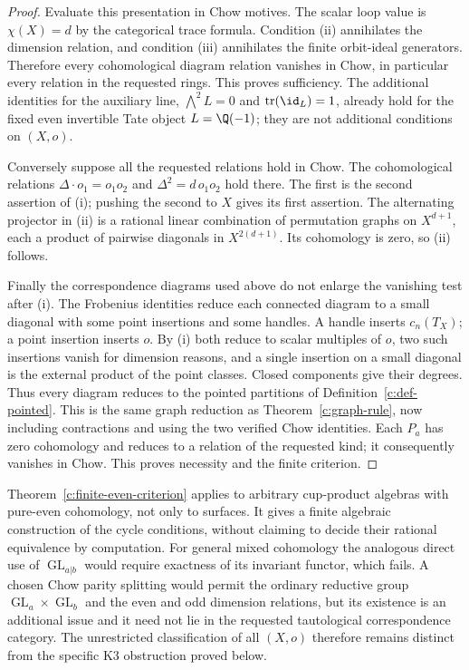 \begin{proof}
Evaluate this presentation in Chow motives.  The scalar loop value
is $\chi(X)=d$ by the categorical trace formula.  Condition (ii)
annihilates the dimension relation, and condition (iii) annihilates
the finite orbit-ideal generators.  Therefore every cohomological
diagram relation vanishes in Chow, in particular every relation in
the requested rings.  This proves sufficiency.
The additional identities for the auxiliary line,
$\bigwedge^2 L=0$ and $\operatorname{tr}(\id_L)=1$, already hold
for the fixed even invertible Tate object $L=\Q(-1)$; they are
not additional conditions on $(X,o)$.

Conversely suppose all the requested relations hold in Chow.
The cohomological relations
$\Delta\cdot o_1=o_1o_2$ and
$\Delta^2=d\,o_1o_2$ hold there.  The first is the second assertion
of (i); pushing the second to $X$ gives its first assertion.
The alternating projector in (ii) is a rational linear combination
of permutation graphs on $X^{d+1}$, each a product of pairwise
diagonals in $X^{2(d+1)}$.  Its cohomology is zero, so (ii) follows.

Finally the correspondence diagrams used above do not enlarge the
vanishing test after (i).  The Frobenius identities reduce each
connected diagram to a small diagonal with some point insertions
and some handles.  A handle inserts $c_n(T_X)$; a point insertion
inserts $o$.  By (i) both reduce to scalar multiples of $o$, two
such insertions vanish for dimension reasons, and a single insertion
on a small diagonal is the external product of the point classes.
Closed components give their degrees.  Thus every diagram reduces
to the pointed partitions of Definition~\ref{c:def-pointed}.
This is the same graph reduction as Theorem~\ref{c:graph-rule},
now including contractions and using the two verified Chow
identities.  Each $P_a$ has zero cohomology and reduces to a relation
of the requested kind; it consequently vanishes in Chow.  This
proves necessity and the finite criterion.
\end{proof}

\begin{remark}
\label{c:finite-criterion-scope}
Theorem~\ref{c:finite-even-criterion} applies to arbitrary cup-product
algebras with pure-even cohomology, not only to surfaces.  It gives
a finite algebraic construction of the cycle conditions, without
claiming to decide their rational equivalence by computation.
For general mixed cohomology the analogous direct use of
$\operatorname{GL}_{a|b}$ would require exactness of its invariant
functor, which fails.  A chosen Chow parity splitting would permit
the ordinary reductive group $\operatorname{GL}_a\times
\operatorname{GL}_b$ and the even and odd dimension relations, but
its existence is an additional issue and it need not lie in the
requested tautological correspondence category.  The unrestricted
classification of all $(X,o)$ therefore remains distinct from the
specific K3 obstruction proved below.
\end{remark}

